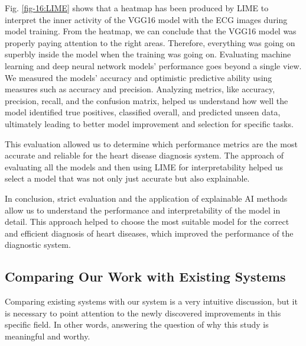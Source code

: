 \documentclass[conference]{IEEEtran}
\begin{document}
Fig. \ref{fig-16:LIME} shows that a heatmap has been produced by LIME to interpret the inner activity of the VGG16 model with the ECG images during model training. From the heatmap, we can conclude that the VGG16 model was properly paying attention to the right areas. Therefore, everything was going on superbly inside the model when the training was going on.
Evaluating machine learning and deep neural network models’ performance goes beyond a single view. We measured the models’ accuracy and optimistic predictive ability using measures such as accuracy and precision. Analyzing metrics, like accuracy, precision, recall, and the confusion matrix, helped us understand how well the model identified true positives, classified overall, and predicted unseen data, ultimately leading to better model improvement and selection for specific tasks.

This evaluation allowed us to determine which performance metrics are the most accurate and reliable for the heart disease diagnosis system. The approach of evaluating all the models and then using LIME for interpretability helped us select a model that was not only just accurate but also explainable.

In conclusion, strict evaluation and the application of explainable AI methods allow us to understand the performance and interpretability of the model in detail. This approach helped to choose the most suitable model for the correct and efficient diagnosis of heart diseases, which improved the performance of the diagnostic system.

\subsection{Comparing Our Work with Existing Systems}

Comparing existing systems with our system is a very intuitive discussion, but it is necessary to point attention to the newly discovered improvements in this specific field. In other words, answering the question of why this study is meaningful and worthy.
\end{document}
